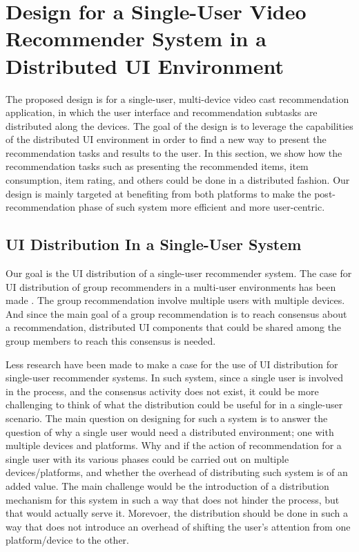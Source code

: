 \section{Design for a Single-User Video Recommender System in a Distributed UI Environment}
The proposed design is for a single-user, multi-device video cast recommendation application, in which the user interface and recommendation subtasks are distributed along the devices. The goal of the design is to leverage the capabilities of the distributed UI environment in order to find a new way to present the recommendation tasks and results to the user. In this section, we show how the recommendation tasks such as presenting the recommended items, item consumption, item rating, and others could be done in a distributed fashion. Our design is mainly targeted at benefiting from both platforms to make the post-recommendation phase of such system more efficient and more user-centric.

\subsection{UI Distribution In a Single-User System}
Our goal is the UI distribution of a single-user recommender system. The case
for UI distribution of group recommenders in a multi-user environments has been
made \cite{worndlvoting}. The group recommendation involve multiple users with
multiple devices.
And since the main goal of a group recommendation is to reach consensus about a recommendation, distributed UI components that could be shared among the group members to reach this consensus is needed.

Less research have been made to make a case for the use of UI distribution for
single-user recommender systems. In such system, since a single user is involved
in the process, and the consensus activity does not exist, it could be more
challenging to think of what the distribution could be useful for in a
single-user scenario. The main question on designing for such a system is to
answer the question of why a single user would need a distributed environment;
one with multiple devices and platforms. Why and if the action of recommendation for a single user with its various phases could be carried out on multiple devices/platforms, and whether the overhead of distributing such system is of an added value. 
The main challenge would be the introduction of a distribution mechanism for
this system in such a way that does not hinder the process, but that would
actually serve it. Morevoer, the distribution should be done in such a way that
does not introduce an overhead of shifting the user's attention from one platform/device to the other.

